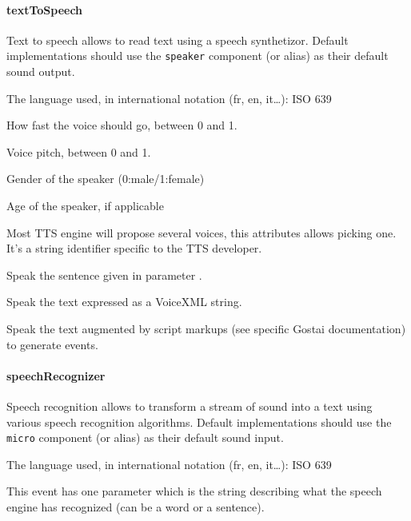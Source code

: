 \paragraph{textToSpeech}
Text to speech allows to read text using a speech synthetizor. Default
implementations should use the \texttt{speaker} component (or alias) as
their default sound output.

\begin{slots}
  {%
    The language used, in international notation (fr, en, it…): ISO
    639%
  }

  {%
    How fast the voice should go, between 0 and 1.%
  }

  {%
    Voice pitch, between 0 and 1.%
  }

  {%
    Gender of the speaker (0:male/1:female)%
  }

  {%
    Age of the speaker, if applicable%
  }

  {%
    Most TTS engine will propose several voices, this attributes
    allows picking one. It’s a string identifier specific to the TTS
    developer.%
  }

  {%
    Speak the sentence given in parameter .%
  }

  {%
    Speak the text  expressed as a VoiceXML string.%
  }

  {%
    Speak the text  augmented by script markups (see specific
    Gostai documentation) to generate \urbi events.%
  }

\end{slots}


\paragraph{speechRecognizer}

Speech recognition allows to transform a stream of sound into a text
using various speech recognition algorithms. Default implementations
should use the \texttt{micro} component (or alias) as their default
sound input.

\begin{slots}
  {%
    The language used, in international notation (fr, en, it…): ISO
    639%
  }

\end{slots}

\begin{slots}[Events]
  {%
    This event has one parameter which is the string describing what
    the speech engine has recognized (can be a word or a sentence).%
  }

\end{slots}

